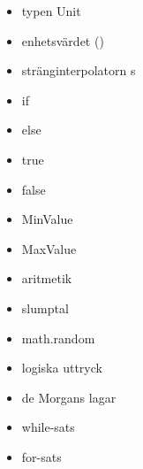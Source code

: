 \begin{multicols}{2}
\begin{itemize}[noitemsep,label={$\square$},leftmargin=*]
\item typen Unit
\item enhetsvärdet ()
\item stränginterpolatorn s
\item if
\item else
\item true
\item false
\item MinValue
\item MaxValue
\item aritmetik
\item slumptal
\item math.random
\item logiska uttryck
\item de Morgans lagar
\item while-sats
\item for-sats\end{itemize}\end{multicols}
